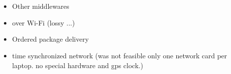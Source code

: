 \chapter{}
\label{sec:conclusion_and_outlook}
\begin{itemize}
    \item Other middlewares
    \item over Wi-Fi (lossy ...)
    \item Ordered package delivery
    \item time synchronized network (was not feasible only one network card per laptop. no special hardware and gps clock.)
\end{itemize}